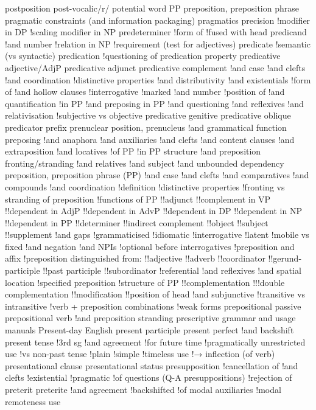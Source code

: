 postposition
post-vocalic/r/
potential word
PP preposition, preposition phrase
pragmatic constraints (and information packaging)
pragmatics
precision
!modifier in DP
!scaling modifier in NP
predeterminer
!form of
!fused with head
predicand
!and number
!relation in NP
!requirement (test for adjectives)
predicate
!semantic (vs syntactic)
predication
!questioning of
predication property
predicative adjective/AdjP
predicative adjunct
predicative complement
!and case
!and clefts
!and coordination
!distinctive properties
!and distributivity
!and existentials
!form of
!and hollow clauses
!interrogative
!marked
!and number
!position of
!and quantification
!in PP
!and preposing in PP
!and questioning
!and reflexives
!and relativisation
!subjective vs objective
predicative genitive
predicative oblique
predicator
prefix
prenuclear position, prenucleus
!and grammatical function
preposing
!and anaphora
!and auxiliaries
!and clefts
!and content clauses
!and extraposition
!and locatives
!of PP
!in PP structure
!and preposition fronting/stranding
!and relatives
!and subject
!and unbounded dependency
preposition, preposition phrase (PP)
!and case
!and clefts
!and comparatives
!and compounds
!and coordination
!definition
!distinctive properties
!fronting vs stranding of preposition
!functions of PP
!!adjunct
!!complement in VP
!!dependent in AdjP
!!dependent in AdvP
!!dependent in DP
!!dependent in NP
!!dependent in PP
!!determiner
!!indirect complement
!!object
!!subject
!!supplement
!and gaps
!grammaticised
!idiomatic
!interrogative
!latent
!mobile vs fixed
!and negation
!and NPIs
!optional before interrogatives
!preposition and affix
!preposition distinguished from:
!!adjective
!!adverb
!!coordinator
!!gerund-participle
!!past participle
!!subordinator
!referential
!and reflexives
!and spatial location
!specified preposition
!structure of PP
!!complementation
!!!double complementation
!!modification
!!position of head
!and subjunctive
!transitive vs intransitive
!verb + preposition combinations
!weak forms
prepositional passive
prepositional verb
!and preposition stranding
prescriptive grammar and usage manuals
Present-day English
present participle
present perfect
!and backshift
present tense
!3rd sg
!and agreement
!for future time
!pragmatically unrestricted use
!vs non-past tense
!plain
!simple
!timeless use
!→ inflection (of verb)
presentational clause
presentational status
presupposition
!cancellation of
!and clefts
!existential
!pragmatic
!of questions (Q-A presuppositions)
!rejection of
preterit
preterite
!and agreement
!backshifted
!of modal auxiliaries
!modal remoteness use
